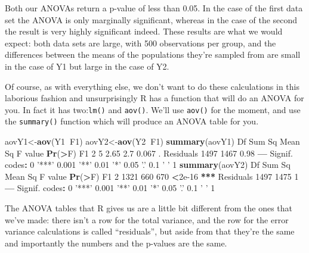 \documentclass[
]{book}
\newenvironment{Shaded}{\begin{snugshade}}{\end{snugshade}}
\newcommand{\DecValTok}[1]{\textcolor[rgb]{0.00,0.00,0.81}{#1}}
\newcommand{\ErrorTok}[1]{\textcolor[rgb]{0.64,0.00,0.00}{\textbf{#1}}}
\newcommand{\FloatTok}[1]{\textcolor[rgb]{0.00,0.00,0.81}{#1}}
\newcommand{\KeywordTok}[1]{\textcolor[rgb]{0.13,0.29,0.53}{\textbf{#1}}}
\newcommand{\NormalTok}[1]{#1}
\newcommand{\OperatorTok}[1]{\textcolor[rgb]{0.81,0.36,0.00}{\textbf{#1}}}
\newcommand{\StringTok}[1]{\textcolor[rgb]{0.31,0.60,0.02}{#1}}
\begin{document}
Both our ANOVAs return a p-value of less than 0.05. In the case of the first data set the ANOVA is only marginally significant, whereas in the case of the second the result is very highly significant indeed. These results are what we would expect: both data sets are large, with 500 observations per group, and the differences between the means of the populations they're sampled from are small in the case of Y1 but large in the case of Y2.

Of course, as with everything else, we don't want to do these calculations in this laborious fashion and unsurprisingly R has a function that will do an ANOVA for you. In fact it has two:\texttt{lm()} and \texttt{aov()}. We'll use \texttt{aov()} for the moment, and use the \texttt{summary()} function which will produce an ANOVA table for you.

\begin{Shaded}
\begin{Highlighting}[]
\NormalTok{aovY1<-}\KeywordTok{aov}\NormalTok{(Y1}\OperatorTok{~}\NormalTok{F1)}
\NormalTok{aovY2<-}\KeywordTok{aov}\NormalTok{(Y2}\OperatorTok{~}\NormalTok{F1)}
\KeywordTok{summary}\NormalTok{(aovY1)}
\NormalTok{              Df Sum Sq Mean Sq F value }\KeywordTok{Pr}\NormalTok{(}\OperatorTok{>}\NormalTok{F)  }
\NormalTok{F1             }\DecValTok{2}      \DecValTok{5}    \FloatTok{2.65}     \FloatTok{2.7}  \FloatTok{0.067}\NormalTok{ .}
\NormalTok{Residuals   }\DecValTok{1497}   \DecValTok{1467}    \FloatTok{0.98}                 
\OperatorTok{---}
\NormalTok{Signif. codes}\OperatorTok{:}\StringTok{  }\DecValTok{0} \StringTok{'***'} \FloatTok{0.001} \StringTok{'**'} \FloatTok{0.01} \StringTok{'*'} \FloatTok{0.05} \StringTok{'.'} \FloatTok{0.1} \StringTok{' '} \DecValTok{1}
\KeywordTok{summary}\NormalTok{(aovY2)}
\NormalTok{              Df Sum Sq Mean Sq F value }\KeywordTok{Pr}\NormalTok{(}\OperatorTok{>}\NormalTok{F)    }
\NormalTok{F1             }\DecValTok{2}   \DecValTok{1321}     \DecValTok{660}     \DecValTok{670} \OperatorTok{<}\FloatTok{2e-16} \OperatorTok{**}\ErrorTok{*}
\NormalTok{Residuals   }\DecValTok{1497}   \DecValTok{1475}       \DecValTok{1}                   
\OperatorTok{---}
\NormalTok{Signif. codes}\OperatorTok{:}\StringTok{  }\DecValTok{0} \StringTok{'***'} \FloatTok{0.001} \StringTok{'**'} \FloatTok{0.01} \StringTok{'*'} \FloatTok{0.05} \StringTok{'.'} \FloatTok{0.1} \StringTok{' '} \DecValTok{1}
\end{Highlighting}
\end{Shaded}

The ANOVA tables that R gives us are a little bit different from the ones that we've made: there isn't a row for the total variance, and the row for the error variance calculations is called ``residuals'', but aside from that they're the same and importantly the numbers and the p-values are the same.
\end{document}
